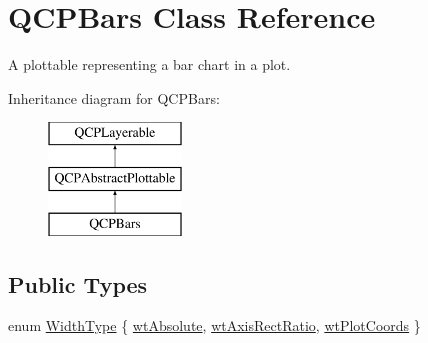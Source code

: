 \hypertarget{classQCPBars}{\section{\-Q\-C\-P\-Bars \-Class \-Reference}
\label{classQCPBars}
}


\-A plottable representing a bar chart in a plot.  


\-Inheritance diagram for \-Q\-C\-P\-Bars\-:\begin{figure}[H]
\begin{center}
\leavevmode
\includegraphics[height=3.000000cm]{classQCPBars}
\end{center}
\end{figure}
\subsection*{\-Public \-Types}
\begin{DoxyCompactItemize}
\item 
enum \hyperlink{classQCPBars_a65dbbf1ab41cbe993d71521096ed4649}{\-Width\-Type} \{ \hyperlink{classQCPBars_a65dbbf1ab41cbe993d71521096ed4649ab74315c9aa77df593c58dd25dfc0de35}{wt\-Absolute}, 
\hyperlink{classQCPBars_a65dbbf1ab41cbe993d71521096ed4649a90bc09899361ad3422ff277f7c790ffe}{wt\-Axis\-Rect\-Ratio}, 
\hyperlink{classQCPBars_a65dbbf1ab41cbe993d71521096ed4649aad3cc60ae1bfb1160a30237bee9eaf10}{wt\-Plot\-Coords}
 \}
\end{DoxyCompactItemize}
